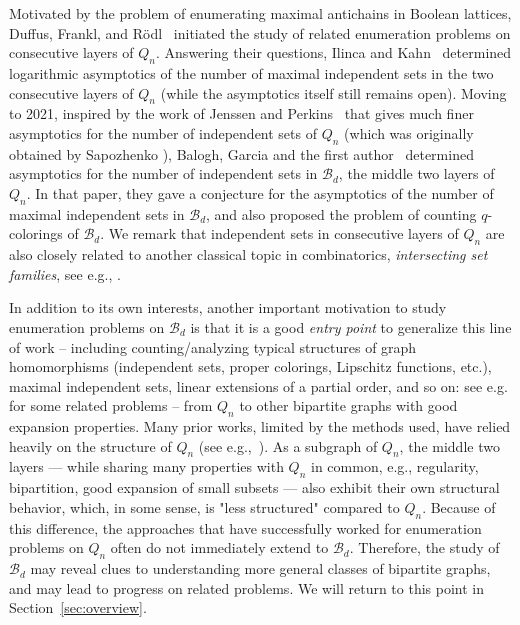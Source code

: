 \documentclass{amsart}
\theoremstyle{definition}
\newcommand{\cB}{\mathcal{B} }
\newcommand{\0}[0]{\emptyset}
\begin{document}
Motivated by the problem of enumerating maximal antichains in Boolean lattices,
Duffus, Frankl, and R\"{o}dl~\cite{duffus2011maximal} initiated the study of related enumeration problems on consecutive layers of $Q_n$. Answering their questions,
Ilinca and Kahn~\cite{ilinca2013counting} determined logarithmic asymptotics of the number of maximal independent sets in the two consecutive layers of $Q_n$ (while the asymptotics itself still remains open). Moving to 2021, inspired by the work of Jenssen and Perkins~\cite{JP} that gives much finer asymptotics for the number of independent sets of $Q_n$ (which was originally obtained by Sapozhenko \cite{Sap87}), Balogh, Garcia and the first author~\cite{BGL} determined asymptotics for the number of independent sets in $\cB_d$, the middle two layers of $Q_n$. In that paper, they gave a conjecture for the asymptotics of the number of maximal independent sets in $\cB_d$, and also proposed the problem of counting $q$-colorings of $\cB_d$.
We remark that independent sets in consecutive layers of $Q_n$ are also closely related to another classical topic in combinatorics, \textit{intersecting set families}, see e.g., \cite{balogh2015intersecting, balogh2021intersecting, balogh2019structure, frankl2018counting}.

In addition to its own interests, another important motivation to study enumeration problems on $\cB_d$ is that it is a good \textit{entry point} to generalize this line of work -- including counting/analyzing typical structures of graph homomorphisms (independent sets, proper colorings, Lipschitz functions, etc.), maximal independent sets, linear extensions of a partial order, and so on: see e.g. \cite{JKP, GGJ, PSY} for some related problems -- from $Q_n$ to other bipartite graphs with good expansion properties. Many prior works, limited by the methods used, have relied heavily on the structure of $Q_n$ (see e.g.,~\cite{EG, G, JK, misqn}).
As a subgraph of $Q_n$, the middle two layers --- while sharing many properties with $Q_n$ in common, e.g., regularity, bipartition, good expansion of small subsets --- also exhibit their own structural behavior, which, in some sense, is {"less structured"} compared to $Q_n$. Because of this difference, the approaches that have successfully worked for enumeration problems on $Q_n$ often do not immediately extend to $\cB_d$. 
Therefore, the study of $\cB_d$ may reveal clues to understanding 
more general classes of bipartite graphs, and may lead to progress on related problems. We will return to this point in Section~\ref{sec:overview}.
\vspace{5pt}
\end{document}

